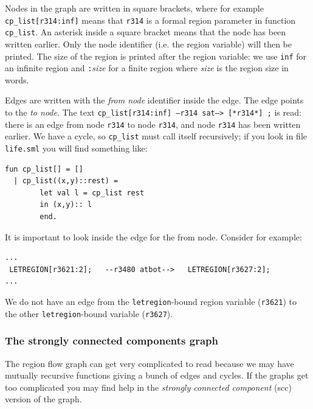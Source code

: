 \documentclass[12pt]{book}
\begin{document}
Nodes in the graph are written in square brackets, where for example
\texttt{cp\_list[r314:inf]} means that \texttt{r314} is a formal region
parameter in function \texttt{cp\_list}. An asterisk inside a square
bracket means that the node has been written earlier. Only the node
identifier (i.e. the region variable) will then be printed. The size of the
region is printed after the region variable: we use \texttt{inf} for an
infinite region and \texttt{:}\emph{size} for a finite region where
\emph{size} is the region size in words.

Edges are written with the \emph{from node} identifier inside the
edge. The edge points to the \emph{to node}. The text
\texttt{cp\_list[r314:inf]  --r314 sat-->   [*r314*] ;} is read: there
is an edge from node \texttt{r314} to node \texttt{r314}, and node
\texttt{r314} has been written earlier. We have a cycle, so
\texttt{cp\_list} must call itself recursively; if you look in file
\texttt{life.sml} you will find something like:

\begin{verbatim}
fun cp_list[] = []
  | cp_list((x,y)::rest) = 
        let val l = cp_list rest
        in (x,y):: l
        end.
\end{verbatim}
\noindent
It is important to look inside the edge for the from node. Consider for
example:
\begin{verbatim}
...
 LETREGION[r3621:2];   --r3480 atbot-->   LETREGION[r3627:2];
...
\end{verbatim}
\noindent
We do not have an edge from the \texttt{letregion}-bound region variable
(\texttt{r3621}) to the other \texttt{letregion}-bound variable (\texttt{r3627}).

\subsubsection{The strongly connected components graph}
The region flow graph can get very complicated to read because we may have
mutually recursive functions giving a bunch of edges and cycles.  If the
graphs get too complicated you may find help in the \emph{strongly
  connected component}
%
(scc) version of the graph.
\end{document}
